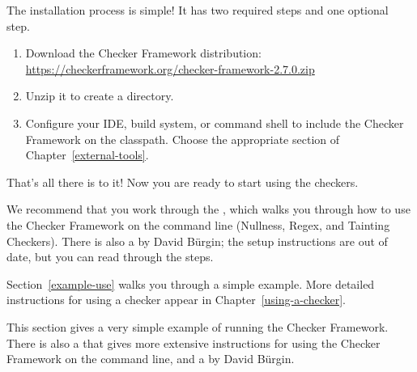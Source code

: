 The installation process is simple!  It has two required steps and one
optional step.
\begin{enumerate}
\item
  Download the Checker Framework distribution:
  \\
  \url{https://checkerframework.org/checker-framework-2.7.0.zip}

\item
  Unzip it to create a  directory.

\item
  \label{installation-configure-step}%
  Configure your IDE, build system, or command shell to include the Checker
  Framework on the classpath.  Choose the appropriate section of
  Chapter~\ref{external-tools}.


\end{enumerate}

That's all there is to it!  Now you are ready to start using the checkers.

We recommend that you work through the
, which walks you through how to use the Checker
Framework on
the command line (Nullness, Regex, and Tainting Checkers).
There is also a
 by David B\"urgin; the setup instructions are out of date, but
you can read through the steps.

Section~\ref{example-use} walks you through a simple example.  More detailed
instructions for using a checker appear in Chapter~\ref{using-a-checker}.




This section gives a very simple example of running the Checker Framework.
There is also a 
that gives more extensive instructions for using the Checker Framework
on the command line,
and a
 by David B\"urgin.

%
%
%
%
%
%


